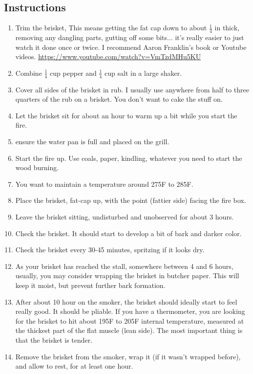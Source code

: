 \begin{multicols}{2}
\subsection*{Instructions}
\begin{enumerate}
    \item Trim the brisket, This means getting the fat cap down to about \( \frac{1}{4} \) in thick, removing any dangling parts, gutting off some bits... it's really easier to just watch it done once or twice. I recommend Aaron Franklin's book or Youtube videos. \url{https://www.youtube.com/watch?v=VmTzdMHu5KU}
    \item Combine \( \frac{1}{4} \) cup pepper and \( \frac{1}{4} \) cup salt in a large shaker.
    \item Cover all sides of the brisket in rub. I usually use anywhere from half to three quarters of the rub on a brisket. You don't want to cake the stuff on.
    \item Let the brisket sit for about an hour to warm up a bit while you start the fire.
    \item ensure the water pan is full and placed on the grill.
    \item Start the fire up. Use coals, paper, kindling, whatever you need to start the wood burning.
    \item You want to maintain a temperature around 275F to 285F.
    \item Place the brisket, fat-cap up, with the point (fattier side) facing the fire box.
    \item Leave the brisket sitting, undisturbed and unobserved for about 3 hours.
    \item Check the brisket. It should start to develop a bit of bark and darker color.
    \item Check the brisket every 30-45 minutes, spritzing if it looks dry.
    \item As your brisket has reached the stall, somewhere between 4 and 6 hours, usually, you may consider wrapping the brisket in butcher paper. This will keep it moist, but prevent further bark formation.
    \item After about 10 hour on the smoker, the brisket should ideally start to feel really good. It should be pliable. If you have a thermometer, you are looking for the brisket to hit about 195F to 205F internal temperature, measured at the thickest part of the flat muscle (lean side). The most important thing is that the brisket is tender.
    \item Remove the brisket from the smoker, wrap it (if it wasn't wrapped before), and allow to rest, for at least one hour.


\end{enumerate}
\end{multicols}
